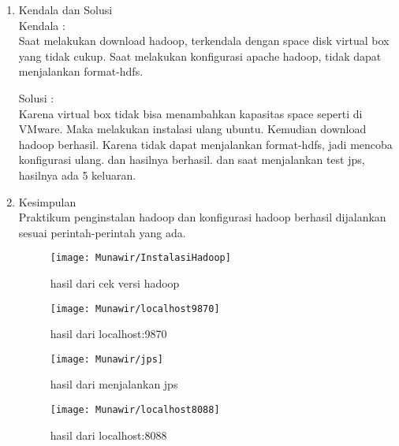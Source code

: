 
\begin{enumerate}
\item Kendala dan Solusi \\
Kendala :\\
Saat melakukan download hadoop, terkendala dengan space disk virtual box yang tidak cukup.
Saat melakukan konfigurasi apache hadoop, tidak dapat menjalankan format-hdfs. 

Solusi :\\
Karena virtual box tidak bisa menambahkan kapasitas space seperti di VMware. Maka melakukan instalasi ulang ubuntu. Kemudian download hadoop berhasil.
Karena tidak dapat menjalankan format-hdfs, jadi mencoba konfigurasi ulang. dan hasilnya berhasil.
dan saat menjalankan test jps, hasilnya ada 5 keluaran.

\item Kesimpulan \\
Praktikum penginstalan hadoop dan konfigurasi hadoop berhasil dijalankan sesuai perintah-perintah yang ada.

\begin{figure}[!ht]
    \texttt{[image: Munawir/InstalasiHadoop]}
    \caption{hasil dari cek versi hadoop}
    \label{gam:perkuliahan-25-11}
    \end{figure}

\begin{figure}[!ht]
    \texttt{[image: Munawir/localhost9870]}
    \caption{hasil dari localhost:9870}
    \label{gam:perkuliahan-25-11}
    \end{figure}

\begin{figure}[!ht]
    \texttt{[image: Munawir/jps]}
    \caption{hasil dari menjalankan jps}
    \label{gam:perkuliahan-25-11}
    \end{figure}

\begin{figure}[!ht]
    \texttt{[image: Munawir/localhost8088]}
    \caption{hasil dari localhost:8088}
    \label{gam:perkuliahan-25-11}
    \end{figure}

\end{enumerate}


